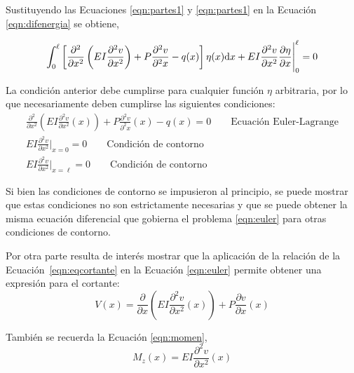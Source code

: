 Sustituyendo las Ecuaciones \eqref{eqn:partes1} y \eqref{eqn:partes1} en la Ecuación \eqref{eqn:difenergia} se obtiene,

\begin{equation}\label{eqn:difenergia2}
\int_0^\ell \left[ \frac{\partial^2}{\partial x^2} \left(  EI \frac{\partial^2 v}{\partial x^2} \right) + P \frac{\partial^2 v}{\partial^2 x} - q(x)  \right] \eta(x) {\text{d}} x + EI\frac{\partial^2 v}{\partial x^2} \frac{\partial \eta}{\partial x}\Bigg|_0^\ell = 0
\end{equation}


La condición anterior debe cumplirse para cualquier función $\eta$ arbitraria, por lo que necesariamente deben cumplirse las siguientes condiciones:
%
\begin{eqnarray}
\frac{\partial^2}{\partial x^2} \left( EI \frac{\partial^2 v}{\partial x^2}(x) \right) + P \frac{\partial^2 v}{\partial^2 x}(x) - q(x) = 0 \qquad \text{Ecuación Euler-Lagrange} \label{eqn:euler} \\
EI\frac{\partial^2 v}{\partial x^2}\Bigg|_{x=0}=0 \qquad \text{Condición de contorno} \label{eqn:contorno1} \\
EI\frac{\partial^2 v}{\partial x^2}\Bigg|_{x=\ell}=0 \qquad \text{Condición de contorno} \label{eqn:contorno2}
\end{eqnarray}

Si bien las condiciones de contorno se impusieron al principio, se puede mostrar que estas condiciones no son estrictamente necesarias y que se puede obtener la misma ecuación diferencial que gobierna el problema \eqref{eqn:euler} para otras condiciones de contorno.

Por otra parte resulta de interés mostrar que la aplicación de la relación de la Ecuación~\eqref{eqn:eqcortante} en la Ecuación \eqref{eqn:euler} permite obtener una expresión para el cortante:
%
\begin{equation}\label{eqn:condcortante}
V(x) =
\frac{\partial}{\partial x} \left( EI \frac{\partial^2 v}{\partial x^2}(x) \right) + P \frac{\partial v}{\partial x}(x)
\end{equation}

También se recuerda la Ecuación \eqref{eqn:momen},  
\begin{equation}\label{eqn:condmomento}
M_z (x) = E I \frac{\partial^2 v}{\partial x^2}(x)
\end{equation}

